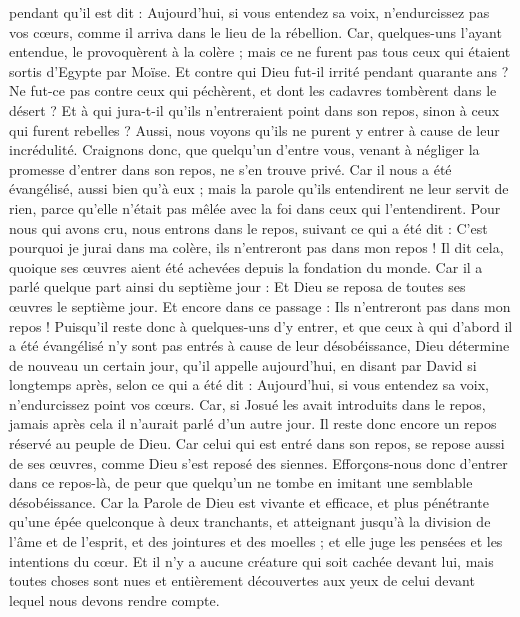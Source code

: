 \begin{multicols}{2}
pendant qu'il est dit : Aujourd'hui, si vous entendez sa voix, n'endurcissez pas vos cœurs, comme il arriva dans le lieu de la rébellion.
Car, quelques-uns l'ayant entendue, le provoquèrent à la colère ; mais ce ne furent pas tous ceux qui étaient sortis d'Egypte par Moïse. 
Et contre qui Dieu fut-il irrité pendant quarante ans ? Ne fut-ce pas contre ceux qui péchèrent, et dont les cadavres tombèrent dans le désert ?
Et à qui jura-t-il qu'ils n'entreraient point dans son repos, sinon à ceux qui furent rebelles ?
Aussi, nous voyons qu'ils ne purent y entrer à cause de leur incrédulité.
\VerseOne{}Craignons donc, que quelqu'un d'entre vous, venant à négliger la promesse d'entrer dans son repos, ne s'en trouve privé.
Car il nous a été évangélisé, aussi bien qu'à eux ; mais la parole qu'ils entendirent ne leur servit de rien, parce qu'elle n'était pas mêlée avec la foi dans ceux qui l'entendirent.
Pour nous qui avons cru, nous entrons dans le repos, suivant ce qui a été dit : C'est pourquoi je jurai dans ma colère, ils n'entreront pas dans mon repos ! Il dit cela, quoique ses œuvres aient été achevées depuis la fondation du monde.
Car il a parlé quelque part ainsi du septième jour : Et Dieu se reposa de toutes ses œuvres le septième jour.
Et encore dans ce passage : Ils n'entreront pas dans mon repos !
Puisqu'il reste donc à quelques-uns d'y entrer, et que ceux à qui d'abord il a été évangélisé n'y sont pas entrés à cause de leur désobéissance,
Dieu détermine de nouveau un certain jour, qu'il appelle aujourd'hui, en disant par David si longtemps après, selon ce qui a été dit : Aujourd'hui, si vous entendez sa voix, n'endurcissez point vos cœurs.
Car, si Josué les avait introduits dans le repos, jamais après cela il n'aurait parlé d'un autre jour.
Il reste donc encore un repos réservé au peuple de Dieu.
Car celui qui est entré dans son repos, se repose aussi de ses œuvres, comme Dieu s'est reposé des siennes.
Efforçons-nous donc d'entrer dans ce repos-là, de peur que quelqu'un ne tombe en imitant une semblable désobéissance.
Car la Parole de Dieu est vivante et efficace, et plus pénétrante qu'une épée quelconque à deux tranchants, et atteignant jusqu'à la division de l'âme et de l'esprit, et des jointures et des moelles ; et elle juge les pensées et les intentions du cœur.
Et il n'y a aucune créature qui soit cachée devant lui, mais toutes choses sont nues et entièrement découvertes aux yeux de celui devant lequel nous devons rendre compte.

\end{multicols}
